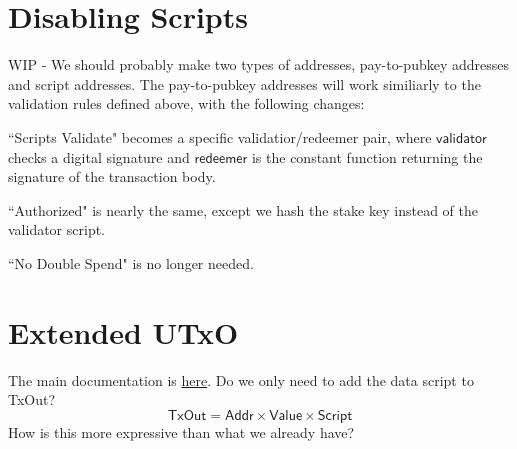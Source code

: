 \documentclass[11pt,a4paper]{article}
\newcommand{\type}[1]{\mathsf{#1}}
\begin{document}

\section{Disabling Scripts}

WIP - We should probably make two types of addresses, pay-to-pubkey addresses and script addresses.
The pay-to-pubkey addresses will work similiarly to the validation rules defined above, with the
following changes:

``Scripts Validate" becomes a specific validatior/redeemer pair, where $\mathsf{validator}$ checks a
digital signature and $\mathsf{redeemer}$ is the constant function returning the signature of the
transaction body.

``Authorized" is nearly the same, except we hash the stake key instead of the validator script.

``No Double Spend" is no longer needed.

\section{Extended UTxO}

The main documentation is \href{https://github.com/input-output-hk/plutus/tree/master/docs/extended-utxo}{here}.
Do we only need to add the data script to TxOut?
$$ \type{TxOut} = \type{Addr} \times \type{Value} \times \type{Script} $$
How is this more expressive than what we already have?



\end{document}
